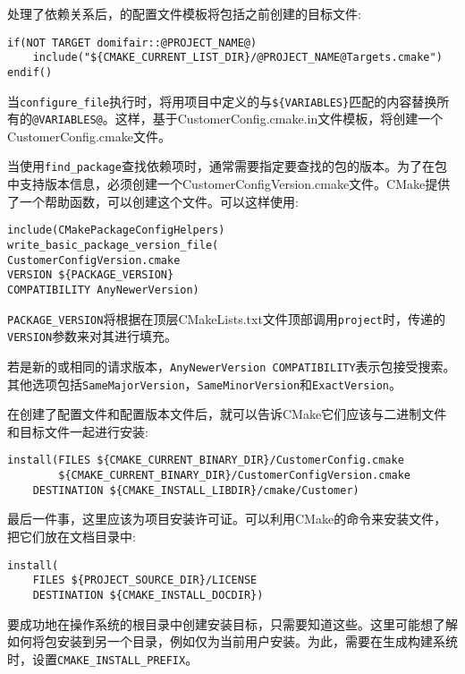 处理了依赖关系后，的配置文件模板将包括之前创建的目标文件:

\begin{lstlisting}[style=styleCMake]
if(NOT TARGET domifair::@PROJECT_NAME@)
	include("${CMAKE_CURRENT_LIST_DIR}/@PROJECT_NAME@Targets.cmake")
endif()
\end{lstlisting}

当\texttt{configure\_file}执行时，将用项目中定义的与\texttt{\$\{VARIABLES\}}匹配的内容替换所有的\texttt{@VARIABLES@}。这样，基于CustomerConfig.cmake.in文件模板，将创建一个CustomerConfig.cmake文件。

当使用\texttt{find\_package}查找依赖项时，通常需要指定要查找的包的版本。为了在包中支持版本信息，必须创建一个CustomerConfigVersion.cmake文件。CMake提供了一个帮助函数，可以创建这个文件。可以这样使用:

\begin{lstlisting}[style=styleCMake]
include(CMakePackageConfigHelpers)
write_basic_package_version_file(
CustomerConfigVersion.cmake
VERSION ${PACKAGE_VERSION}
COMPATIBILITY AnyNewerVersion)
\end{lstlisting}

\texttt{PACKAGE\_VERSION}将根据在顶层CMakeLists.txt文件顶部调用\texttt{project}时，传递的\texttt{VERSION}参数来对其进行填充。

若是新的或相同的请求版本，\texttt{AnyNewerVersion COMPATIBILITY}表示包接受搜索。其他选项包括\texttt{SameMajorVersion}，\texttt{SameMinorVersion}和\texttt{ExactVersion}。

在创建了配置文件和配置版本文件后，就可以告诉CMake它们应该与二进制文件和目标文件一起进行安装:

\begin{lstlisting}[style=styleCMake]
install(FILES ${CMAKE_CURRENT_BINARY_DIR}/CustomerConfig.cmake
		${CMAKE_CURRENT_BINARY_DIR}/CustomerConfigVersion.cmake
	DESTINATION ${CMAKE_INSTALL_LIBDIR}/cmake/Customer)
\end{lstlisting}

最后一件事，这里应该为项目安装许可证。可以利用CMake的命令来安装文件，把它们放在文档目录中:

\begin{lstlisting}[style=styleCMake]
install(
	FILES ${PROJECT_SOURCE_DIR}/LICENSE
	DESTINATION ${CMAKE_INSTALL_DOCDIR})
\end{lstlisting}

要成功地在操作系统的根目录中创建安装目标，只需要知道这些。这里可能想了解如何将包安装到另一个目录，例如仅为当前用户安装。为此，需要在生成构建系统时，设置\texttt{CMAKE\_INSTALL\_PREFIX}。

